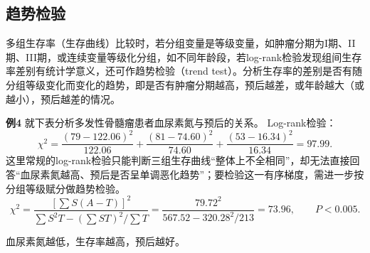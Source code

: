 \subsection{趋势检验}
多组生存率（生存曲线）比较时，若分组变量是等级变量，如肿瘤分期为I期、II期、III期，或连续变量等级化分组，如不同年龄段，若log-rank检验发现组间生存率差别有统计学意义，还可作趋势检验（trend test）。分析生存率的差别是否有随分组等级变化而变化的趋势，即是否有肿瘤分期越高，预后越差，或年龄越大（或越小），预后越差的情况。

\textbf{例4} 就下表分析多发性骨髓瘤患者血尿素氮与预后的关系。
Log-rank检验：
\[
\chi^2=\frac{(79-122.06)^2}{122.06}+\frac{(81-74.60)^2}{74.60}+\frac{(53-16.34)^2}{16.34}=97.99.
\]
这里常规的log-rank检验只能判断三组生存曲线“整体上不全相同”，却无法直接回答“血尿素氮越高、预后是否呈单调恶化趋势”；要检验这一有序梯度，需进一步按分组等级赋分做趋势检验。
\[
\chi^2=\frac{[\sum S(A-T)]^2}{\sum S^2T-(\sum ST)^2/\sum T}
=\frac{79.72^2}{567.52-320.28^2/213}=73.96,\qquad P<0.005.
\]
\begin{annotation}血尿素氮越低，生存率越高，预后越好。\end{annotation}
